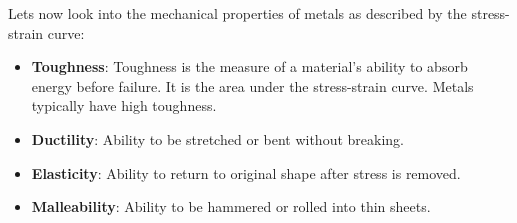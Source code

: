 \documentclass[12pt]{article}
\begin{document}
Lets now look into the mechanical properties of metals as described by the
stress-strain curve:
\begin{itemize}
    \item \textbf{Toughness}: Toughness is the measure of a material's ability to absorb energy before failure. It is the area under the stress-strain curve. Metals typically have high toughness.
    \item \textbf{Ductility}: Ability to be stretched or bent without breaking.
    \item \textbf{Elasticity}: Ability to return to original shape after stress is removed.
    \item \textbf{Malleability}: Ability to be hammered or rolled into thin sheets.
\end{itemize}
\end{document}
